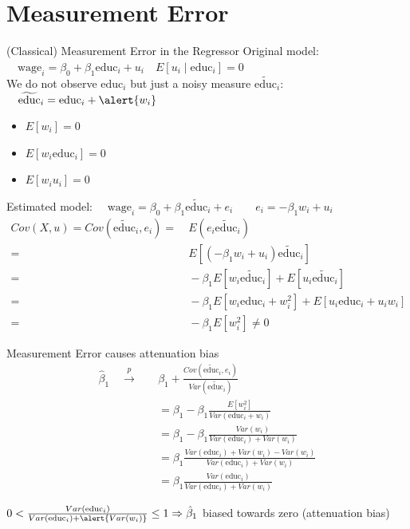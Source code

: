 \documentclass[11pt, aspectratio = 169]{beamer}
\begin{document}
\section{Measurement Error}

\begin{frame}{(Classical) Measurement Error in the Regressor}
Original model: $\quad \text{wage}_i = \beta_0 + \beta_1 \text{educ}_i + u_i  \quad E[u_i \mid \text{educ}_i] = 0$ 
\\
\pause
We do not observe $\text{educ}_i$ but just a noisy measure $\widetilde{\text{educ}}_{i}$:
$\quad \widetilde{\text{educ}}_{i} = \text{educ}_{i} + \alert{w_i}$
\vspace{-2mm}
\begin{itemize}
    \item $E[w_i] = 0$
    \item $E[w_i \text{educ}_i] = 0$ 
    \item $E[w_i u_i] = 0$
\end{itemize}
Estimated model: 
$\quad \text{wage}_i = \beta_0 + \beta_1 \widetilde{\text{educ}}_{i} + e_i \quad \quad e_i = - \beta_1 w_{i} + u_i$
\vspace{+0.2cm}
\pause
\begin{align*}
Cov(X, u)  = Cov(\widetilde{\text{educ}}_{i}, e_i) 
= & \ E(e_i \widetilde{\text{educ}}_{i}) \\
= & \ E[(-\beta_1 w_{i} + u_i)\widetilde{\text{educ}}_{i}] \\
= & \ -\beta_1 E[w_i \widetilde{\text{educ}}_{i}] + E[u_i \widetilde{\text{educ}}_{i}] \\
= & \ -\beta_1 E[w_i \text{educ}_i + w_i^2] + E[u_i \text{educ}_i + u_i w_i] \\
= & \ -\beta_1 E[w_i^2] \neq 0
\end{align*}
\end{frame}

\begin{frame}{Measurement Error causes attenuation bias}
\begin{align*}
\hat{\beta}_1
\quad \xrightarrow{p} \quad & \beta_1 + \frac{ Cov(\widetilde{\text{educ}}_{i}, e_i) }{ Var(\widetilde{\text{educ}}_{i}) } \\
&= \beta_1 - \beta_1 \frac{ E[w_i^2] }{ Var(\text{educ}_i + w_i) } \\
&= \beta_1 - \beta_1 \frac{ Var(w_i) }{ Var(\text{educ}_i) + Var(w_i) } \\
&= \beta_1 \frac{ Var(\text{educ}_i) + Var(w_i) - Var(w_i) }{ Var(\text{educ}_i) + Var(w_i) } \\
&= \beta_1 \frac{ Var(\text{educ}_i) }{ Var(\text{educ}_i) + Var(w_i) }
\end{align*}

$0 < \frac{ Var(\text{educ}_i) }{ Var(\text{educ}_i) + \alert{Var(w_i)}} \leq 1 
\Rightarrow \hat{\beta}_1$ biased towards zero (attenuation bias)
\end{frame}
\end{document}
